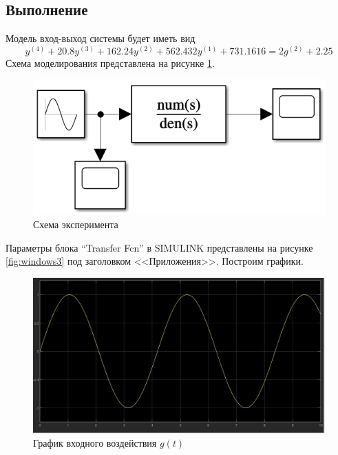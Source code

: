 \documentclass[a4paper, 12pt]{article}
\begin{document}
    \subsection{Выполнение}
    Модель вход-выход системы будет иметь вид
    $$y^{(4)}+20.8y^{(3)}+162.24y^{(2)}+562.432y^{(1)}+731.1616=2g^{(2)}+2.25$$
    Схема моделирования представлена на рисунке \ref{fig:scheme3}.
    \begin{figure}[H]
        \centering
        \includegraphics[scale=0.8]{scheme3.png}
        \captionsetup{skip=0pt}
        \caption{Схема эксперимента}
        \label{fig:scheme3}
    \end{figure}
    \noindent Параметры блока ``Transfer Fcn'' в SIMULINK
    представлены на рисунке \ref{fig:windows3} под заголовком <<Приложения>>. Построим графики.
    \begin{figure}[H]
        \centering
        \includegraphics[scale=0.3]{task_3_g.jpg}
        \captionsetup{skip=0pt}
        \caption{График входного воздействия $g(t)$}
        \label{fig:gt2}
    \end{figure}
\end{document}
